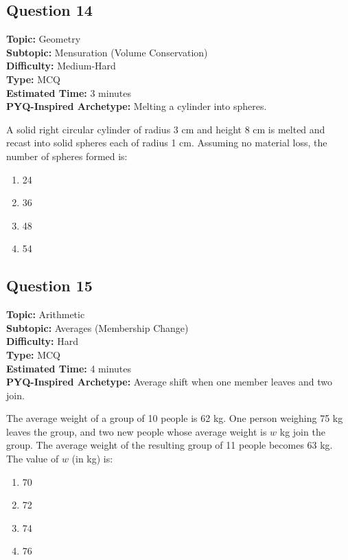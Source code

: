 \documentclass[11pt]{article}
\begin{document}
\subsection*{Question 14}
\textbf{Topic:} Geometry \\
\textbf{Subtopic:} Mensuration (Volume Conservation) \\
\textbf{Difficulty:} Medium-Hard \\
\textbf{Type:} MCQ \\
\textbf{Estimated Time:} 3 minutes \\
\textbf{PYQ-Inspired Archetype:} Melting a cylinder into spheres.

\begin{tcolorbox}
A solid right circular cylinder of radius 3 cm and height 8 cm is melted and recast into solid spheres each of radius 1 cm. Assuming no material loss, the number of spheres formed is:
\end{tcolorbox}
\begin{enumerate}[label=(\Alph*)]
\item 24
\item 36
\item 48
\item 54
\end{enumerate}

\subsection*{Question 15}
\textbf{Topic:} Arithmetic \\
\textbf{Subtopic:} Averages (Membership Change) \\
\textbf{Difficulty:} Hard \\
\textbf{Type:} MCQ \\
\textbf{Estimated Time:} 4 minutes \\
\textbf{PYQ-Inspired Archetype:} Average shift when one member leaves and two join.

\begin{tcolorbox}
The average weight of a group of 10 people is 62 kg. One person weighing 75 kg leaves the group, and two new people whose average weight is \(w\) kg join the group. The average weight of the resulting group of 11 people becomes 63 kg. The value of \(w\) (in kg) is:
\end{tcolorbox}
\begin{enumerate}[label=(\Alph*)]
\item 70
\item 72
\item 74
\item 76
\end{enumerate}
\end{document}
